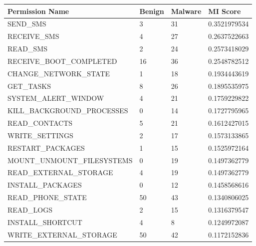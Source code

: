 \begin{table}[]
\centering
\begin{tabular}{|l|l|l|l|}
\hline
\textbf{Permission Name}    & \textbf{Benign} & \textbf{Malware} & \textbf{MI Score} \\ \hline
SEND\_SMS                   & 3               & 31               & 0.3521979534      \\ \hline
RECEIVE\_SMS                & 4               & 27               & 0.2637522663      \\ \hline
READ\_SMS                   & 2               & 24               & 0.2573418029      \\ \hline
RECEIVE\_BOOT\_COMPLETED    & 16              & 36               & 0.2548782512      \\ \hline
CHANGE\_NETWORK\_STATE      & 1               & 18               & 0.1934443619      \\ \hline
GET\_TASKS                  & 8               & 26               & 0.1895535975      \\ \hline
SYSTEM\_ALERT\_WINDOW       & 4               & 21               & 0.1759229822      \\ \hline
KILL\_BACKGROUND\_PROCESSES & 0               & 14               & 0.1727795965      \\ \hline
READ\_CONTACTS              & 5               & 21               & 0.1612427015      \\ \hline
WRITE\_SETTINGS             & 2               & 17               & 0.1573133865      \\ \hline
RESTART\_PACKAGES           & 1               & 15               & 0.1525972164      \\ \hline
MOUNT\_UNMOUNT\_FILESYSTEMS & 0               & 19               & 0.1497362779      \\ \hline
READ\_EXTERNAL\_STORAGE     & 4               & 19               & 0.1497362779      \\ \hline
INSTALL\_PACKAGES           & 0               & 12               & 0.1458568616      \\ \hline
READ\_PHONE\_STATE          & 50              & 43               & 0.1340806025      \\ \hline
READ\_LOGS                  & 2               & 15               & 0.1316379547      \\ \hline
INSTALL\_SHORTCUT           & 4               & 8                & 0.1249972087      \\ \hline
WRITE\_EXTERNAL\_STORAGE    & 50              & 42               & 0.1172152836      \\ \hline

\end{tabular}
\end{table}
